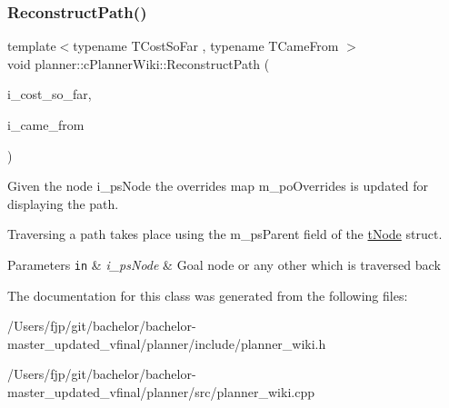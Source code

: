 \subsubsection{\texorpdfstring{Reconstruct\+Path()}{ReconstructPath()}\hspace{0.1cm}{\footnotesize\ttfamily [2/2]}}
{\footnotesize\ttfamily template$<$typename T\+Cost\+So\+Far , typename T\+Came\+From $>$ \\
void planner\+::c\+Planner\+Wiki\+::\+Reconstruct\+Path (\begin{DoxyParamCaption}\item[{T\+Cost\+So\+Far \&\&}]{i\+\_\+cost\+\_\+so\+\_\+far,  }\item[{T\+Came\+From \&\&}]{i\+\_\+came\+\_\+from }\end{DoxyParamCaption})}



Given the node i\+\_\+ps\+Node the overrides map m\+\_\+po\+Overrides is updated for displaying the path. 

Traversing a path takes place using the m\+\_\+ps\+Parent field of the \mbox{\hyperlink{structplanner_1_1t_node}{t\+Node}} struct. 
\begin{DoxyParams}[1]{Parameters}
\mbox{\tt in}  & {\em i\+\_\+ps\+Node} & Goal node or any other which is traversed back \\
\hline
\end{DoxyParams}


The documentation for this class was generated from the following files\+:\begin{DoxyCompactItemize}
\item 
/\+Users/fjp/git/bachelor/bachelor-\/master\+\_\+updated\+\_\+vfinal/planner/include/planner\+\_\+wiki.\+h\item 
/\+Users/fjp/git/bachelor/bachelor-\/master\+\_\+updated\+\_\+vfinal/planner/src/planner\+\_\+wiki.\+cpp\end{DoxyCompactItemize}
